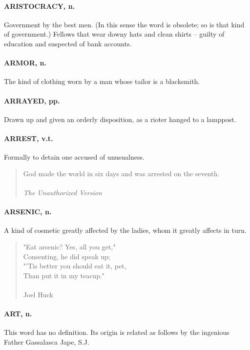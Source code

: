 \documentclass[11pt]{article}
\begin{document}
\paragraph{ARISTOCRACY, n.}  Government by the best men.  (In this sense the word
is obsolete; so is that kind of government.)  Fellows that wear downy
hats and clean shirts -- guilty of education and suspected of bank
accounts.

\paragraph{ARMOR, n.}  The kind of clothing worn by a man whose tailor is a
blacksmith.

\paragraph{ARRAYED, pp.}  Drawn up and given an orderly disposition, as a rioter
hanged to a lamppost.

\paragraph{ARREST, v.t.}  Formally to detain one accused of unusualness.

\begin{quote}   God made the world in six days and was arrested on the seventh. \\
 \\
{\em The Unauthorized Version} \end{quote}


\paragraph{ARSENIC, n.}  A kind of cosmetic greatly affected by the ladies, whom
it greatly affects in turn.

\begin{quote}   "Eat arsenic?  Yes, all you get," \\
      Consenting, he did speak up; \\
  "'Tis better you should eat it, pet, \\
      Than put it in my teacup." \\
 \\
Joel Huck \end{quote}


\paragraph{ART, n.}  This word has no definition.  Its origin is related as
follows by the ingenious Father Gassalasca Jape, S.J.
\end{document}
